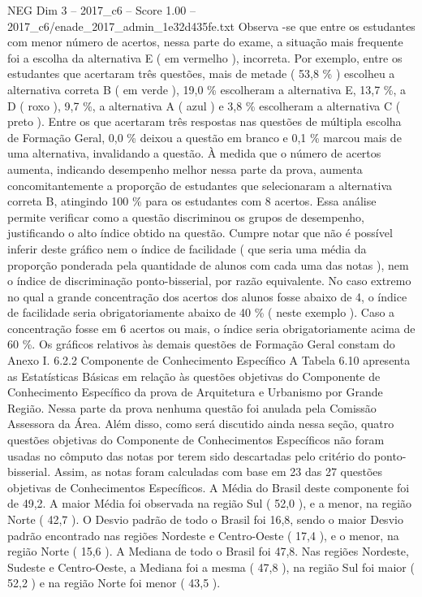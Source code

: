 \begin{textsample}{NEG Dim 3 – 2017\_c6 – Score 1.00 – 2017\_c6/enade\_2017\_admin\_1e32d435fe.txt}
Observa -se que entre os estudantes com menor número de acertos, nessa parte do exame, a situação mais frequente foi a escolha da alternativa E ( em vermelho ), incorreta.
Por exemplo, entre os estudantes que acertaram três questões, mais de metade ( 53,8 \% ) escolheu a alternativa correta B ( em verde ), 19,0 \% escolheram a alternativa E, 13,7 \%, a D ( roxo ), 9,7 \%, a alternativa A ( azul ) e 3,8 \% escolheram a alternativa C ( preto ).
Entre os que acertaram três respostas nas questões de múltipla escolha de Formação Geral, 0,0 \% deixou a questão em branco e 0,1 \% marcou mais de uma alternativa, invalidando a questão.
À medida que o número de acertos aumenta, indicando desempenho melhor nessa parte da prova, aumenta concomitantemente a proporção de estudantes que selecionaram a alternativa correta B, atingindo 100 \% para os estudantes com 8 acertos.
Essa análise permite verificar como a questão discriminou os grupos de desempenho, justificando o alto índice obtido na questão.
Cumpre notar que não é possível inferir deste gráfico nem o índice de facilidade ( que seria uma média da proporção ponderada pela quantidade de alunos com cada uma das notas ), nem o índice de discriminação ponto-bisserial, por razão equivalente.
No caso extremo no qual a grande concentração dos acertos dos alunos fosse abaixo de 4, o índice de facilidade seria obrigatoriamente abaixo de 40 \% ( neste exemplo ).
Caso a concentração fosse em 6 acertos ou mais, o índice seria obrigatoriamente acima de 60 \%.
Os gráficos relativos às demais questões de Formação Geral constam do Anexo I. 6.2.2 Componente de Conhecimento Específico A Tabela 6.10 apresenta as Estatísticas Básicas em relação às questões objetivas do Componente de Conhecimento Específico da prova de Arquitetura e Urbanismo por Grande Região.
Nessa parte da prova nenhuma questão foi anulada pela Comissão Assessora da Área.
Além disso, como será discutido ainda nessa seção, quatro questões objetivas do Componente de Conhecimentos Específicos não foram usadas no cômputo das notas por terem sido descartadas pelo critério do ponto-bisserial.
Assim, as notas foram calculadas com base em 23 das 27 questões objetivas de Conhecimentos Específicos.
A Média do Brasil deste componente foi de 49,2.
A maior Média foi observada na região Sul ( 52,0 ), e a menor, na região Norte ( 42,7 ).
O Desvio padrão de todo o Brasil foi 16,8, sendo o maior Desvio padrão encontrado nas regiões Nordeste e Centro-Oeste ( 17,4 ), e o menor, na região Norte ( 15,6 ).
A Mediana de todo o Brasil foi 47,8.
Nas regiões Nordeste, Sudeste e Centro-Oeste, a Mediana foi a mesma ( 47,8 ), na região Sul foi maior ( 52,2 ) e na região Norte foi menor ( 43,5 ).

\end{textsample}
